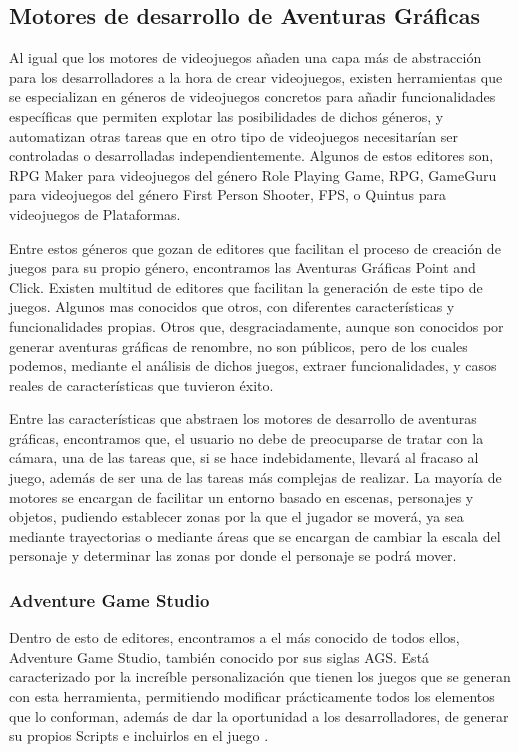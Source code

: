 \subsection{Motores de desarrollo de Aventuras Gráficas}
\label{herramientasaventuras}

Al igual que los motores de videojuegos añaden una capa más de abstracción para los desarrolladores a la hora de crear videojuegos, existen herramientas que se especializan en géneros de videojuegos concretos para añadir funcionalidades específicas que permiten explotar las posibilidades de dichos géneros, y automatizan otras tareas que en otro tipo de videojuegos necesitarían ser controladas o desarrolladas independientemente. Algunos de estos editores son, RPG Maker para videojuegos del género Role Playing Game, RPG, GameGuru para videojuegos del género First Person Shooter, FPS, o Quintus para videojuegos de Plataformas.

Entre estos géneros que gozan de editores que facilitan el proceso de creación de juegos para su propio género, encontramos las Aventuras Gráficas Point and Click. Existen multitud de editores que facilitan la generación de este tipo de juegos. Algunos mas conocidos que otros, con diferentes características y funcionalidades propias. Otros que, desgraciadamente, aunque son conocidos por generar aventuras gráficas de renombre, no son públicos, pero de los cuales podemos, mediante el análisis de dichos juegos, extraer funcionalidades, y casos reales de características que tuvieron éxito.

Entre las características que abstraen los motores de desarrollo de aventuras gráficas, encontramos que, el usuario no debe de preocuparse de tratar con la cámara, una de las tareas que, si se hace indebidamente, llevará al fracaso al juego, además de ser una de las tareas más complejas de realizar. La mayoría de motores se encargan de facilitar un entorno basado en escenas, personajes y objetos, pudiendo establecer zonas por la que el jugador se moverá, ya sea mediante trayectorias o mediante áreas que se encargan de cambiar la escala del personaje y determinar las zonas por donde el personaje se podrá mover.

\subsubsection{Adventure Game Studio}
\label{adventuregamestudio}

Dentro de esto de editores, encontramos a el más conocido de todos ellos, Adventure Game Studio, también conocido por sus siglas AGS. Está caracterizado por la increíble personalización que tienen los juegos que se generan con esta herramienta, permitiendo modificar prácticamente todos los elementos que lo conforman, además de dar la oportunidad a los desarrolladores, de generar su propios Scripts e incluirlos en el juego \cite{adventuregamestudio}. 

